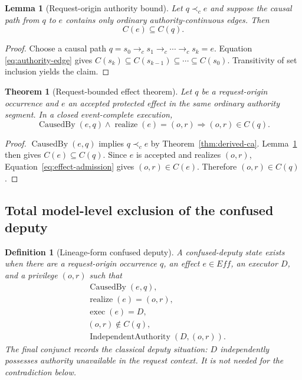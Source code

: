 \documentclass[10pt,twocolumn]{article}
\newcommand{\CausedBy}{\operatorname{CausedBy}}
\newcommand{\Realize}{\operatorname{realize}}
\newcommand{\Exec}{\operatorname{exec}}
\newcommand{\IndAuth}{\operatorname{IndependentAuthority}}
\newcommand{\hb}{\prec_{c}}
\newtheorem{definition}{Definition}
\newtheorem{theorem}{Theorem}
\newtheorem{lemma}{Lemma}
\begin{document}
\begin{lemma}[Request-origin authority bound]
\label{lem:req-bound}
Let $q\hb e$ and suppose the causal path from $q$ to $e$ contains only ordinary
authority-continuous edges. Then
\begin{equation}
  C(e)\subseteq C(q).
  \label{eq:req-bound}
\end{equation}
\end{lemma}

\begin{proof}
Choose a causal path
$q=s_0\to_c s_1\to_c\cdots\to_c s_k=e$. Equation
\eqref{eq:authority-edge} gives
$C(s_k)\subseteq C(s_{k-1})\subseteq\cdots\subseteq C(s_0)$. Transitivity of
set inclusion yields the claim.
\end{proof}

\begin{theorem}[Request-bounded effect theorem]
\label{thm:req-effect}
Let $q$ be a request-origin occurrence and $e$ an accepted protected effect in
the same ordinary authority segment. In a closed event-complete execution,
\begin{equation}
 \CausedBy(e,q)\land\Realize(e)=(o,r)
 \Longrightarrow (o,r)\in C(q).
 \label{eq:req-effect}
\end{equation}
\end{theorem}

\begin{proof}
$\CausedBy(e,q)$ implies $q\hb e$ by Theorem~\ref{thm:derived-ca}.
Lemma~\ref{lem:req-bound} then gives $C(e)\subseteq C(q)$. Since $e$ is
accepted and realizes $(o,r)$, Equation~\eqref{eq:effect-admission} gives
$(o,r)\in C(e)$. Therefore $(o,r)\in C(q)$.
\end{proof}

\subsection{Total model-level exclusion of the confused deputy}

\begin{definition}[Lineage-form confused deputy]
A confused-deputy state exists when there are a request-origin occurrence $q$,
an effect $e\in Eff$, an executor $D$, and a privilege $(o,r)$ such that
\begin{align}
  &\CausedBy(e,q),\\
  &\Realize(e)=(o,r),\\
  &\Exec(e)=D,\\
  &(o,r)\notin C(q),\\
  &\IndAuth(D,(o,r)).
  \label{eq:cda-def}
\end{align}
The final conjunct records the classical deputy situation: $D$ independently
possesses authority unavailable in the request context. It is not needed for
the contradiction below.
\end{definition}
\end{document}
